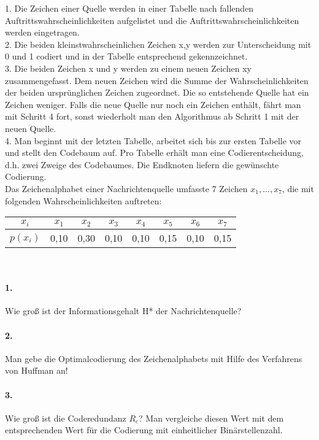 \documentclass[paper=a4, fontsize=11pt]{scrartcl}
\numberwithin{equation}{section}
\numberwithin{figure}{section}
\numberwithin{table}{section}
\begin{document}
1. Die Zeichen einer Quelle werden in einer Tabelle nach fallenden Auftrittswahrscheinlichkeiten aufgelistet und die Auftrittswahrscheinlichkeiten werden eingetragen. \\
2. Die beiden kleinstwahrscheinlichen Zeichen x,y werden zur Unterscheidung mit 0 und 1 codiert und in der Tabelle entsprechend gekennzeichnet. \\
3. Die beiden Zeichen x und y werden zu einem neuen Zeichen xy zusammengefasst. Dem neuen Zeichen wird die Summe der Wahrscheinlichkeiten der beiden ursprünglichen Zeichen zugeordnet. Die so entstehende Quelle hat ein Zeichen weniger. Falls die neue Quelle nur noch ein Zeichen enthält, fährt man mit Schritt 4 fort, sonst wiederholt man den Algorithmus ab Schritt 1 mit der neuen Quelle. \\
4. Man beginnt mit der letzten Tabelle, arbeitet sich bis zur ersten Tabelle vor und stellt den Codebaum auf. Pro Tabelle erhält man eine Codierentscheidung, d.h. zwei Zweige des Codebaumes. Die Endknoten liefern die gewünschte Codierung. \\

Das Zeichenalphabet einer Nachrichtenquelle umfasste 7 Zeichen $x_{1}, ..., x_{7}$, die mit folgenden Wahrscheinlichkeiten auftreten: 

\begin{center}
\begin{tabular}{|c||c|c|c|c|c|c|c|}
\hline
$x_{i}$ & $x_{1}$ & $x_{2}$ & $x_{3}$ & $x_{4}$ & $x_{5}$ & $x_{6}$ & $x_{7}$ \\
\hline
$p(x_{i})$ & 0,10 & 0,30 & 0,10 & 0,10 & 0,15 & 0,10 & 0,15 \\
\hline
\end{tabular}
\end{center}
\\

\paragraph{1.}
Wie groß ist der Informationsgehalt H* der Nachrichtenquelle? \\

\paragraph{2.}
Man gebe die Optimalcodierung des Zeichenalphabets mit Hilfe des Verfahrens von Huffman an! \\

\paragraph{3.}
Wie groß ist die Coderedundanz $R_{c}$? Man vergleiche diesen Wert mit dem entsprechenden Wert für die Codierung mit einheitlicher Binärstellenzahl.
\end{document}
